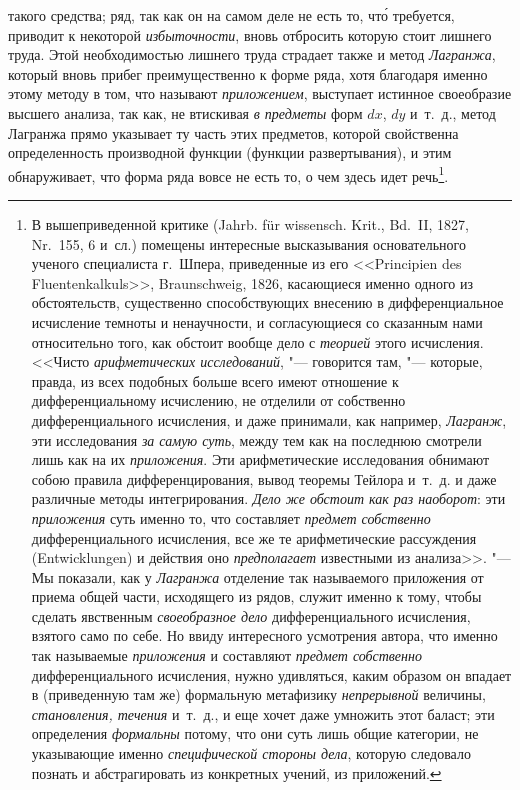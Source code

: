 такого средства; ряд, так как он на самом деле не есть то, чт\'{о} требуется,
приводит к некоторой {\em избыточности}, вновь отбросить которую стоит лишнего
труда. Этой необходимостью лишнего труда страдает также и метод {\em Лагранжа},
который вновь прибег преимущественно к форме ряда, хотя благодаря именно этому
методу в том, что называют {\em приложением}, выступает истинное своеобразие
высшего анализа, так как, не втискивая {\em в предметы} форм $dx$, $dy$
и~т.~д., метод Лагранжа прямо указывает ту часть этих предметов, которой
свойственна определенность производной функции (функции развертывания), и этим
обнаруживает, что форма ряда вовсе не есть то, о чем здесь идет речь\footnote{В
вышеприведенной критике (Jahrb. für wissensch. Krit., Bd.~II, 1827, Nr.~155, 6
и~сл.) помещены интересные высказывания основательного ученого специалиста
г.~Шпера, приведенные из его <<Prin\-ci\-pien des Flu\-enten\-kal\-kuls>>,
Braun\-schweig, 1826, касающиеся именно одного из обстоятельств, существенно
способствующих внесению в дифференциальное исчисление темноты и ненаучности, и
согласующиеся со сказанным нами относительно того, как обстоит вообще дело с
{\em теорией} этого исчисления. <<Чисто {\em арифметических исследований}, "---
говорится там, "--- которые, правда, из всех подобных больше всего имеют
отношение к дифференциальному исчислению, не отделили от собственно
дифференциального исчисления, и даже принимали, как например, {\em Лагранж},
эти исследования {\em за самую суть}, между тем как на последнюю смотрели лишь
как на их {\em приложения}. Эти арифметические исследования обнимают собою
правила дифференцирования, вывод теоремы Тейлора и~т.~д. и даже различные
методы интегрирования. {\em Дело же обстоит как раз наоборот}: эти
{\em приложения} суть именно то, что составляет {\em предмет собственно}
дифференциального исчисления, все же те арифметические рассуждения
(Ent\-wick\-lungen) и действия оно {\em предполагает} известными из анализа>>.
"--- Мы показали, как у {\em Лагранжа} отделение так называемого приложения от
приема общей части, исходящего из рядов, служит именно к тому, чтобы сделать
явственным {\em своеобразное дело} дифференциального исчисления, взятого само
по себе. Но ввиду интересного усмотрения автора, что именно так называемые
{\em приложения} и составляют {\em предмет собственно} дифференциального
исчисления, нужно удивляться, каким образом он впадает в (приведенную там же)
формальную метафизику {\em непрерывной} величины, {\em становления, течения}
и~т.~д., и еще хочет даже умножить этот баласт; эти определения {\em формальны}
потому, что они суть лишь общие категории, не указывающие именно
{\em специфической стороны дела}, которую следовало познать и абстрагировать
из конкретных учений, из приложений.}.

